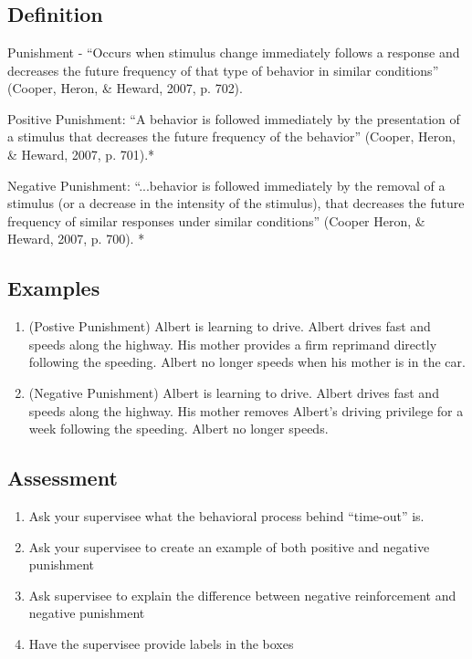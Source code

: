 \clearpage \section{\fourdSixteen{}}
\subsection{Definition}
Punishment - ``Occurs when stimulus change immediately follows a response and decreases the future frequency of that type of behavior in similar conditions'' (Cooper, Heron, \& Heward, 2007, p. 702).

Positive Punishment: ``A behavior is followed immediately by the presentation of a stimulus that decreases the future frequency of the behavior'' (Cooper, Heron, \& Heward, 2007, p. 701).*

Negative Punishment: ``...behavior is followed immediately by the removal of a stimulus (or a decrease in the intensity of the stimulus), that decreases the future frequency of similar responses under similar conditions'' (Cooper Heron, \& Heward, 2007, p. 700). *

\subsection{Examples}
\begin{enumerate}
\item (Postive Punishment) Albert is learning to drive.  Albert drives fast and speeds along the highway.  His mother provides a firm reprimand directly following the speeding.  Albert no longer speeds when his mother is in the car. 
\item (Negative Punishment) Albert is learning to drive.  Albert drives fast and speeds along the highway.  His mother removes Albert's driving privilege for a week following the speeding.  Albert no longer speeds.
\end{enumerate}
%
\subsection{Assessment}
\begin{enumerate}
\item Ask your supervisee what the behavioral process behind ``time-out'' is. 
\item Ask your supervisee to create an example of both positive and negative punishment
\item Ask supervisee to explain the difference between negative reinforcement and negative punishment
\item Have the supervisee provide labels in the boxes
\end{enumerate}
%

